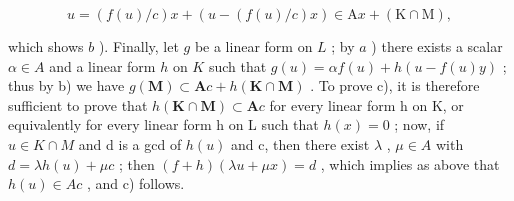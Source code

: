 \[
u = (f (u) / c) x + (u - (f (u) / c) x) \in \mathrm{A} x + (\mathrm{K} \cap \mathrm{M}),
\]

which shows \(b\) ). Finally, let \(g\) be a linear form on \(L\) ; by \(a\) ) there exists a scalar \(\alpha \in A\) and a linear form \(h\) on \(K\) such that \(g(u) = \alpha f(u) + h(u - f(u)y)\) ; thus by b) we have \(g(\mathbf{M}) \subset \mathbf{A}c + h(\mathbf{K} \cap \mathbf{M})\) . To prove c), it is therefore sufficient to prove that \(h(\mathbf{K} \cap \mathbf{M}) \subset \mathbf{A}c\) for every linear form h on K, or equivalently for every linear form h on L such that \(h(x) = 0\) ; now, if \(u \in K \cap M\) and d is a gcd of \(h(u)\) and c, then there exist \(\lambda\) , \(\mu \in A\) with \(d = \lambda h(u) + \mu c\) ; then \((f + h)(\lambda u + \mu x) = d\) , which implies as above that \(h(u) \in Ac\) , and c) follows.

